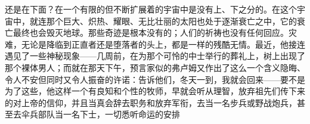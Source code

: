     还是在下面？在一个有限的但不断扩展着的宇宙中是没有上、下之分的。在这个宇宙中，就连那个巨大、炽热、耀眼、无比壮丽的太阳也处于逐渐衰亡之中，它的衰亡最终也会毁灭地球。那些奇迹是根本没有的；人们的祈祷也没有任何回应。灾难，无论是降临到正直者还是堕落者的头上，都是一样的残酷无情。最近，他接连遇见了一些神秘现象——几周前，在为那个可怜的中士举行的葬礼上，树上出现了那个裸体男人；而就在那天下午，预言家似的弗卢姆又作出了这么一个含义隐晦、令人不安但同时又令人振奋的许诺：告诉他们，冬天一到，我就会回来——要不是为了这些，他这样一个有良知和个性的牧师，早就会听从理智，放弃祖先们传下来的对上帝的信仰，并且当真会辞去职务和放弃军衔，去当一名步兵或野战炮兵，甚至去伞兵部队当一名下士，一切悉听命运的安排

